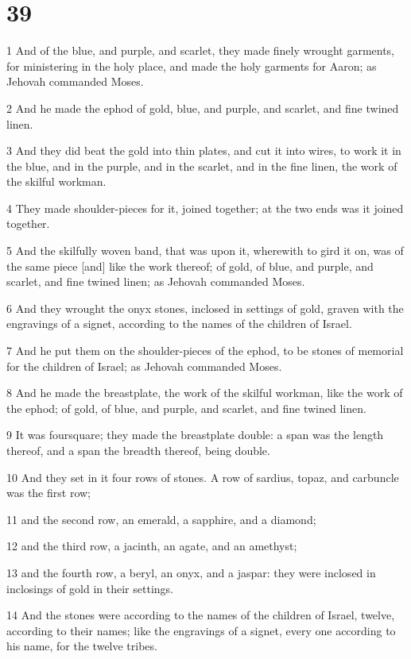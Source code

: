 \chapter{39}

\par 1 And of the blue, and purple, and scarlet, they made finely wrought garments, for ministering in the holy place, and made the holy garments for Aaron; as Jehovah commanded Moses.
\par 2 And he made the ephod of gold, blue, and purple, and scarlet, and fine twined linen.
\par 3 And they did beat the gold into thin plates, and cut it into wires, to work it in the blue, and in the purple, and in the scarlet, and in the fine linen, the work of the skilful workman.
\par 4 They made shoulder-pieces for it, joined together; at the two ends was it joined together.
\par 5 And the skilfully woven band, that was upon it, wherewith to gird it on, was of the same piece [and] like the work thereof; of gold, of blue, and purple, and scarlet, and fine twined linen; as Jehovah commanded Moses.
\par 6 And they wrought the onyx stones, inclosed in settings of gold, graven with the engravings of a signet, according to the names of the children of Israel.
\par 7 And he put them on the shoulder-pieces of the ephod, to be stones of memorial for the children of Israel; as Jehovah commanded Moses.
\par 8 And he made the breastplate, the work of the skilful workman, like the work of the ephod; of gold, of blue, and purple, and scarlet, and fine twined linen.
\par 9 It was foursquare; they made the breastplate double: a span was the length thereof, and a span the breadth thereof, being double.
\par 10 And they set in it four rows of stones. A row of sardius, topaz, and carbuncle was the first row;
\par 11 and the second row, an emerald, a sapphire, and a diamond;
\par 12 and the third row, a jacinth, an agate, and an amethyst;
\par 13 and the fourth row, a beryl, an onyx, and a jaspar: they were inclosed in inclosings of gold in their settings.
\par 14 And the stones were according to the names of the children of Israel, twelve, according to their names; like the engravings of a signet, every one according to his name, for the twelve tribes.
